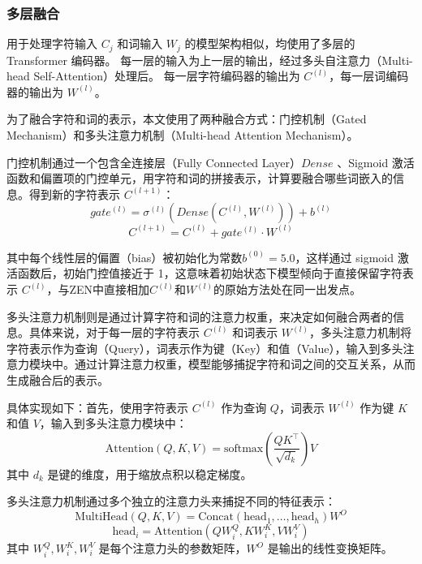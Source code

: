 \documentclass[12pt, a4paper]{ctexart}
\begin{document}
\subsubsection{多层融合}
用于处理字符输入 $C_j$ 和词输入 $W_j$ 的模型架构相似，均使用了多层的 Transformer 编码器。
每一层的输入为上一层的输出，经过多头自注意力（Multi-head Self-Attention）处理后。
每一层字符编码器的输出为 $C^{(l)}$，每一层词编码器的输出为 $W^{(l)}$。

为了融合字符和词的表示，本文使用了两种融合方式：门控机制（Gated Mechanism）和多头注意力机制（Multi-head Attention Mechanism）。

门控机制通过一个包含全连接层（Fully Connected Layer）$Dense$ 、Sigmoid 激活函数和偏置项的门控单元，用字符和词的拼接表示，计算要融合哪些词嵌入的信息。得到新的字符表示 $C^{(l+1)}$：
\begin{equation}
        gate^{(l)} = {\sigma}^{(l)} (Dense(C^{(l)}, W^{(l)}) ) + b^{(l)} 
\end{equation}
\begin{equation}
    C^{(l+1)} = C^{(l)} + gate^{(l)} \cdot W^{(l)}
\end{equation}

其中每个线性层的偏置（bias）被初始化为常数$b^{(0)} = 5.0$，这样通过 sigmoid 激活函数后，初始门控值接近于 1，这意味着初始状态下模型倾向于直接保留字符表示 $C^{(l)}$，与ZEN中直接相加$C^{(l)}$和$W^{(l)}$的原始方法处在同一出发点。

\vspace{2em} %

多头注意力机制则是通过计算字符和词的注意力权重，来决定如何融合两者的信息。具体来说，对于每一层的字符表示 $C^{(l)}$ 和词表示 $W^{(l)}$，多头注意力机制将字符表示作为查询（Query），词表示作为键（Key）和值（Value），输入到多头注意力模块中。通过计算注意力权重，模型能够捕捉字符和词之间的交互关系，从而生成融合后的表示。

具体实现如下：首先，使用字符表示 $C^{(l)}$ 作为查询 $Q$，词表示 $W^{(l)}$ 作为键 $K$ 和值 $V$，输入到多头注意力模块中：
\begin{equation}
    \text{Attention}(Q, K, V) = \text{softmax}\left(\frac{QK^\top}{\sqrt{d_k}}\right)V
\end{equation}
其中 $d_k$ 是键的维度，用于缩放点积以稳定梯度。

多头注意力机制通过多个独立的注意力头来捕捉不同的特征表示：
\begin{equation}
    \text{MultiHead}(Q, K, V) = \text{Concat}(\text{head}_1, \dots, \text{head}_h)W^O
\end{equation}
\begin{equation}
    \text{head}_i = \text{Attention}(QW_i^Q, KW_i^K, VW_i^V)
\end{equation}
其中 $W_i^Q, W_i^K, W_i^V$ 是每个注意力头的参数矩阵，$W^O$ 是输出的线性变换矩阵。
\end{document}
